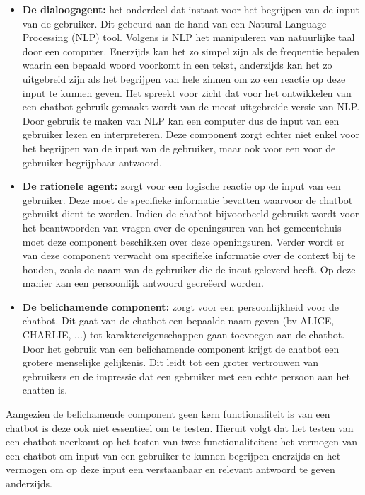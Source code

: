 \begin{itemize}

\item \textbf{De dialoogagent:} het onderdeel dat instaat voor het begrijpen van de input van de gebruiker. Dit gebeurd aan de hand van een Natural Language Processing (NLP) tool. Volgens \textcite{Bird2009} is NLP het manipuleren van natuurlijke taal door een computer. Enerzijds kan het zo simpel zijn als de frequentie bepalen waarin een bepaald woord voorkomt in een tekst, anderzijds kan het zo uitgebreid zijn als het begrijpen van hele zinnen om zo een reactie op deze input te kunnen geven. Het spreekt voor zicht dat voor het ontwikkelen van een chatbot gebruik gemaakt wordt van de meest uitgebreide versie van NLP. Door gebruik te maken van NLP kan een computer dus de input van een gebruiker lezen en interpreteren. Deze component zorgt echter niet enkel voor het begrijpen van de input van de gebruiker, maar ook voor een voor de gebruiker begrijpbaar antwoord. 

\item \textbf{De rationele agent:} zorgt voor een logische reactie op de input van een gebruiker. Deze moet de specifieke informatie bevatten waarvoor de chatbot gebruikt dient te worden. Indien de chatbot bijvoorbeeld gebruikt wordt voor het beantwoorden van vragen over de openingsuren van het gemeentehuis moet deze component beschikken over deze openingsuren. Verder wordt er van deze component verwacht om specifieke informatie over de context bij te houden, zoals de naam van de gebruiker die de inout geleverd heeft. Op deze manier kan een persoonlijk antwoord gecreëerd worden.


\item \textbf{De belichamende component:} zorgt voor een persoonlijkheid voor de chatbot. Dit gaat van de chatbot een bepaalde naam geven (bv ALICE, CHARLIE, ...) tot karaktereigenschappen gaan toevoegen aan de chatbot. Door het gebruik van een belichamende component krijgt de chatbot een grotere menselijke gelijkenis. Dit leidt tot een groter vertrouwen van gebruikers en de impressie dat een gebruiker met een echte persoon aan het chatten is.

\end{itemize}

Aangezien de belichamende component geen kern functionaliteit is van een chatbot is deze ook niet essentieel om te testen. Hieruit volgt dat het testen van een chatbot neerkomt op het testen van twee functionaliteiten: het vermogen van een chatbot om input van een gebruiker te kunnen begrijpen enerzijds en het vermogen om op deze input een verstaanbaar en relevant antwoord te geven  anderzijds.

